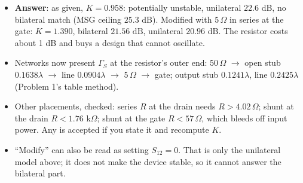 \begin{itemize}
  \item \textbf{Answer}: as given, $K = 0.958$: potentially unstable, unilateral $22.6$ dB, no
    bilateral match (MSG ceiling $25.3$ dB). Modified with $5\,\Omega$ in series at the gate:
    $K = 1.390$, bilateral $\boxed{21.56\text{ dB}}$, unilateral $\boxed{20.96\text{ dB}}$. The
    resistor costs about 1 dB and buys a design that cannot oscillate.
  \item Networks now present $\Gamma_S$ at the resistor's outer end: $50\,\Omega$ $\rightarrow$
    open stub $0.1638\lambda$ $\rightarrow$ line $0.0904\lambda$ $\rightarrow$ $5\,\Omega$
    $\rightarrow$ gate; output stub $0.1241\lambda$, line $0.2425\lambda$ (Problem 1's table method).
  \item Other placements, checked: series $R$ at the drain needs $R > 4.02\,\Omega$; shunt at the
    drain $R < 1.76$ k$\Omega$; shunt at the gate $R < 57\,\Omega$, which bleeds off input power.
    Any is accepted if you state it and recompute $K$.
  \item ``Modify'' can also be read as setting $S_{12} = 0$. That is only the unilateral model
    above; it does not make the device stable, so it cannot answer the bilateral part.
\end{itemize}

\vspace{2pt}

{\color{sub}\footnotesize {}}

